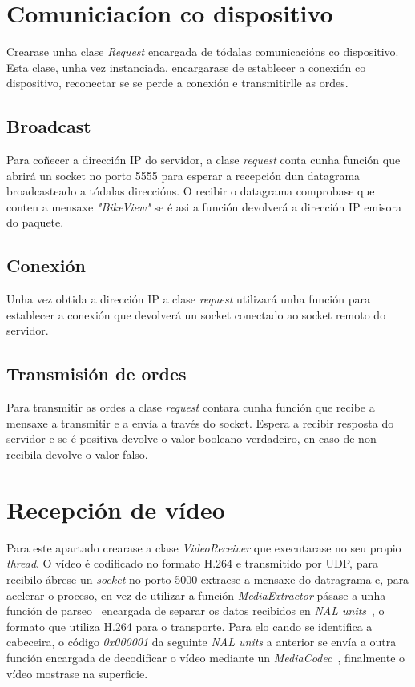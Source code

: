 \section{Comuniciacíon co dispositivo}
Crearase unha clase \emph{Request} encargada de tódalas comunicacións co dispositivo.  Esta clase, unha vez instanciada, encargarase de establecer a conexión co dispositivo, reconectar se se perde a conexión e transmitirlle as ordes.

\subsection{Broadcast}
Para coñecer a dirección IP do servidor, a clase \emph{request} conta cunha función que abrirá un socket no porto 5555 para esperar a recepción dun datagrama broadcasteado a tódalas direccións. O recibir o datagrama comprobase que conten a mensaxe \emph{"BikeView"} se é asi a función devolverá a dirección IP emisora do paquete.

\subsection{Conexión}
Unha vez obtida a dirección IP a clase \emph{request} utilizará unha función para establecer a conexión que devolverá un socket conectado ao socket remoto do servidor.

\subsection{Transmisión de ordes}
Para transmitir as ordes a clase \emph{request} contara cunha función que recibe a mensaxe a transmitir e a envía a través do socket. Espera a recibir resposta do servidor e se é positiva devolve o valor booleano verdadeiro, en caso de non recibila devolve o valor falso.

\section{Recepción de vídeo}
Para este apartado crearase a clase \emph{VideoReceiver} que executarase no seu propio \emph{thread}. O vídeo é codificado no formato H.264 e transmitido por UDP, para recibilo ábrese un \emph{socket} no porto 5000 extraese a mensaxe do datragrama e, para acelerar o proceso, en vez de utilizar a función \emph{MediaExtractor} pásase a unha función de parseo~\cite{consti10ContributeConsti10MyMediaCodecPlayerforFPV2018a} encargada de separar os datos recibidos en \emph{NAL units}~\cite{NetworkAbstractionLayer2019}, o formato que utiliza H.264 para o transporte. Para elo cando se identifica a cabeceira, o código \emph{0x000001} da seguinte \emph{NAL units} a anterior se envía a outra función encargada de decodificar o vídeo mediante un \emph{MediaCodec}~\cite{MediaCodec}, finalmente o vídeo mostrase na superficie.

